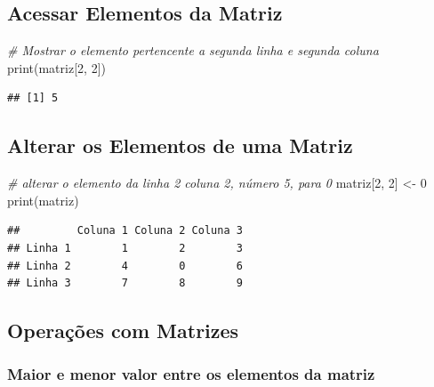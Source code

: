 \documentclass[
]{article}
\newenvironment{Shaded}{\begin{snugshade}}{\end{snugshade}}
\newcommand{\CommentTok}[1]{\textcolor[rgb]{0.56,0.35,0.01}{\textit{#1}}}
\newcommand{\DecValTok}[1]{\textcolor[rgb]{0.00,0.00,0.81}{#1}}
\newcommand{\FunctionTok}[1]{\textcolor[rgb]{0.00,0.00,0.00}{#1}}
\newcommand{\NormalTok}[1]{#1}
\newcommand{\OtherTok}[1]{\textcolor[rgb]{0.56,0.35,0.01}{#1}}
\begin{document}
\hypertarget{acessar-elementos-da-matriz}{%
\subsection{Acessar Elementos da
Matriz}\label{acessar-elementos-da-matriz}}

\begin{Shaded}
\begin{Highlighting}[]
\CommentTok{\# Mostrar o elemento pertencente a segunda linha e segunda coluna}
\FunctionTok{print}\NormalTok{(matriz[}\DecValTok{2}\NormalTok{, }\DecValTok{2}\NormalTok{])}
\end{Highlighting}
\end{Shaded}

\begin{verbatim}
## [1] 5
\end{verbatim}

\hypertarget{alterar-os-elementos-de-uma-matriz}{%
\subsection{Alterar os Elementos de uma
Matriz}\label{alterar-os-elementos-de-uma-matriz}}

\begin{Shaded}
\begin{Highlighting}[]
\CommentTok{\# alterar o elemento da linha 2 coluna 2, número 5, para 0}
\NormalTok{matriz[}\DecValTok{2}\NormalTok{, }\DecValTok{2}\NormalTok{] }\OtherTok{\textless{}{-}} \DecValTok{0}
\FunctionTok{print}\NormalTok{(matriz)}
\end{Highlighting}
\end{Shaded}

\begin{verbatim}
##         Coluna 1 Coluna 2 Coluna 3
## Linha 1        1        2        3
## Linha 2        4        0        6
## Linha 3        7        8        9
\end{verbatim}

\hypertarget{operauxe7uxf5es-com-matrizes}{%
\subsection{Operações com Matrizes}\label{operauxe7uxf5es-com-matrizes}}

\hypertarget{maior-e-menor-valor-entre-os-elementos-da-matriz}{%
\subsubsection{\texorpdfstring{\textbf{Maior e menor valor entre os
elementos da
matriz}}{Maior e menor valor entre os elementos da matriz}}\label{maior-e-menor-valor-entre-os-elementos-da-matriz}}
\end{document}
